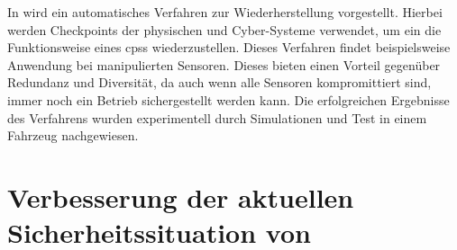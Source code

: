 \documentclass[final,bibliography=totocnumbered]{include/sikseminar}
\newcommand{\cps}{\glspl{cps}\xspace}
\begin{document}
    In \cite{KXW+18} wird ein automatisches Verfahren zur Wiederherstellung vorgestellt.
    Hierbei werden Checkpoints der physischen und Cyber-Systeme verwendet, um ein die Funktionsweise eines \cps wiederzustellen.
    Dieses Verfahren findet beispielsweise Anwendung bei manipulierten Sensoren.
    Dieses bieten einen Vorteil gegenüber Redundanz und Diversität, da auch wenn alle Sensoren kompromittiert sind, immer noch ein Betrieb sichergestellt werden kann.
    Die erfolgreichen Ergebnisse des Verfahrens wurden experimentell durch Simulationen und Test in einem Fahrzeug nachgewiesen.

    \section{Verbesserung der aktuellen Sicherheitssituation von }
    \label{sec:improve-security-situation}

    \newpage

    \printbibliography
    \newpage
\end{document}
